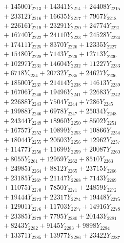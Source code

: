 \documentclass[a4paper,10pt]{article}
\begin{document}
{\begin{align}
&\;  + 14500 Y_{2213} + 14341 Y_{2214} + 24408 Y_{2215} \\[0.3ex]
&\;  + 23312 Y_{2216} + 16635 Y_{2217} + 7967 Y_{2218} \\[0.5ex]\allowbreak
&\;  + 22616 Y_{2219} + 23291 Y_{2220} + 24774 Y_{2221} \\[0.3ex]
&\;  + 16740 Y_{2222} + 24110 Y_{2223} + 24528 Y_{2224} \\[0.3ex]
&\;  + 17411 Y_{2225} + 8370 Y_{2226} + 12335 Y_{2227} \\[0.3ex]
&\;  + 15480 Y_{2228} + 7143 Y_{2229} + 12713 Y_{2230} \\[0.3ex]
&\;  + 10297 Y_{2231} + 14604 Y_{2232} + 11227 Y_{2233} \\[0.3ex]
&\;  + 6718 Y_{2234} + 20732 Y_{2235} + 24627 Y_{2236} \\[0.3ex]
&\;  + 18500 Y_{2237} + 21414 Y_{2238} + 14613 Y_{2239} \\[0.3ex]
&\;  + 16706 Y_{2240} + 19496 Y_{2241} + 22683 Y_{2242} \\[0.3ex]
&\;  + 22688 Y_{2243} + 7504 Y_{2244} + 7286 Y_{2245} \\[0.3ex]
&\;  + 19988 Y_{2246} + 6978 Y_{2247} + 25034 Y_{2248} \\[0.5ex]\allowbreak
&\;  + 24344 Y_{2249} + 18960 Y_{2250} + 8502 Y_{2251} \\[0.3ex]
&\;  + 16757 Y_{2252} + 10899 Y_{2253} + 10866 Y_{2254} \\[0.3ex]
&\;  + 18044 Y_{2255} + 20503 Y_{2256} + 12962 Y_{2257} \\[0.3ex]
&\;  + 11477 Y_{2258} + 11699 Y_{2259} + 20087 Y_{2260} \\[0.3ex]
&\;  + 8055 Y_{2261} + 12959 Y_{2262} + 8510 Y_{2263} \\[0.3ex]
&\;  + 24985 Y_{2264} + 8812 Y_{2265} + 23715 Y_{2266} \\[0.3ex]
&\;  + 23185 Y_{2267} + 21147 Y_{2268} + 7143 Y_{2269} \\[0.3ex]
&\;  + 11075 Y_{2270} + 7850 Y_{2271} + 24859 Y_{2272} \\[0.3ex]
&\;  + 19444 Y_{2273} + 22317 Y_{2274} + 19448 Y_{2275} \\[0.3ex]
&\;  + 12901 Y_{2276} + 11703 Y_{2277} + 14916 Y_{2278} \\[0.5ex]\allowbreak
&\;  + 23385 Y_{2279} + 7795 Y_{2280} + 20143 Y_{2281} \\[0.3ex]
&\;  + 8243 Y_{2282} + 9145 Y_{2283} + 9898 Y_{2284} \\[0.3ex]
&\;  + 13371 Y_{2285} + 13977 Y_{2286} + 23422 Y_{2287} \\[0.3ex]

\end{align}}
\end{document}
